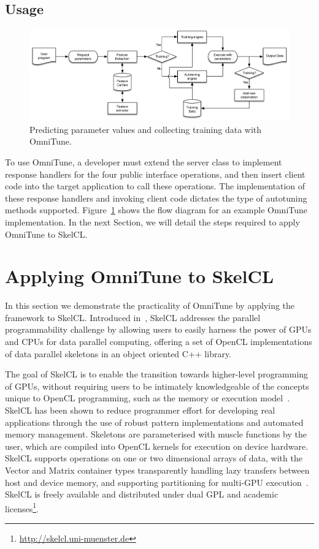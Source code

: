 \documentclass[nonatbib,preprint,9pt]{sigplanconf}
\begin{document}
\subsection{Usage}

\begin{figure}
\centering
\includegraphics[width=\columnwidth]{img/omnitune-system-flow.pdf}
\caption[Optimisation parameter selection with OmniTune]{%
  Predicting parameter values and collecting training data with
  OmniTune.%
}
\label{fig:omnitune-system-flow}
\end{figure}

To use OmniTune, a developer must extend the server class to implement
response handlers for the four public interface operations, and then
insert client code into the target application to call these
operations. The implementation of these response handlers and invoking
client code dictates the type of autotuning methods
supported. Figure~\ref{fig:omnitune-system-flow} shows the flow
diagram for an example OmniTune implementation. In the next Section,
we will detail the steps required to apply OmniTune to SkelCL.


\section{Applying OmniTune to SkelCL}\label{sec:omnitune-skelcl}

In this section we demonstrate the practicality of OmniTune by
applying the framework to SkelCL. Introduced in~\cite{Steuwer2011},
SkelCL addresses the parallel programmability challenge by allowing
users to easily harness the power of GPUs and CPUs for data parallel
computing, offering a set of OpenCL implementations of data parallel
skeletons in an object oriented C++ library.

The goal of SkelCL is to enable the transition towards higher-level
programming of GPUs, without requiring users to be intimately
knowledgeable of the concepts unique to OpenCL programming, such as
the memory or execution model~\cite{Steuwer2012}. SkelCL has been
shown to reduce programmer effort for developing real applications
through the use of robust pattern implementations and automated memory
management. Skeletons are parameterised with muscle functions by the
user, which are compiled into OpenCL kernels for execution on device
hardware. SkelCL supports operations on one or two dimensional arrays
of data, with the Vector and Matrix container types transparently
handling lazy transfers between host and device memory, and supporting
partitioning for multi-GPU execution~\cite{Steuwer2013a}. SkelCL is
freely available and distributed under dual GPL and academic
licenses\footnote{\url{http://skelcl.uni-muenster.de}}.
\end{document}
